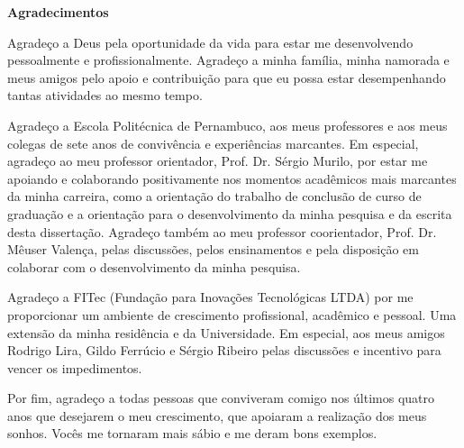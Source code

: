 \begin{flushbottom}
\begin{flushleft}
{\huge \textbf{Agradecimentos}}
\linebreak
\linebreak
\end{flushleft}

Agradeço a Deus pela oportunidade da vida para estar me desenvolvendo pessoalmente e profissionalmente. Agradeço a minha família, minha namorada e meus amigos pelo apoio e contribuição para que eu possa estar desempenhando tantas atividades ao mesmo tempo.

Agradeço a Escola Politécnica de Pernambuco, aos meus professores e aos meus colegas de sete anos de convivência e experiências marcantes. Em especial, agradeço ao meu professor orientador, Prof. Dr. Sérgio Murilo, por estar me apoiando e colaborando positivamente nos momentos acadêmicos mais marcantes da minha carreira, como a orientação do trabalho de conclusão de curso de graduação e a orientação para o desenvolvimento da minha pesquisa e da escrita desta dissertação. Agradeço também ao meu professor coorientador, Prof. Dr. Mêuser Valença, pelas discussões, pelos ensinamentos e pela disposição em colaborar com o desenvolvimento da minha pesquisa.

Agradeço a FITec (Fundação para Inovações Tecnológicas LTDA) por me proporcionar um ambiente de crescimento profissional, acadêmico e pessoal. Uma extensão da minha residência e da Universidade. Em especial, aos meus amigos Rodrigo Lira, Gildo Ferrúcio e Sérgio Ribeiro pelas discussões e incentivo para vencer os impedimentos.

Por fim, agradeço a todas pessoas que conviveram comigo nos últimos quatro anos que desejarem o meu crescimento, que apoiaram a realização dos meus sonhos. Vocês me tornaram mais sábio e me deram bons exemplos.

\end{flushbottom}
\newpage
